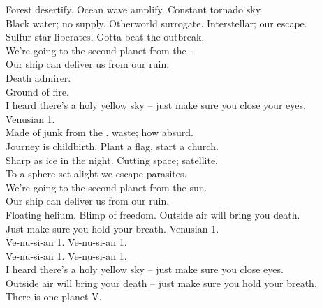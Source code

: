 Forest desertify. Ocean wave amplify. Constant tornado sky. \\
Black water; no supply. Otherworld surrogate. Interstellar; our escape. \\
Sulfur star liberates. Gotta beat the outbreak. \\

We're going to the second planet from the . \\
Our ship can deliver us from our ruin. \\

Death admirer. \\
Ground of fire. \\
I heard there's a holy yellow sky -- just make sure you close your eyes. \\
Venusian 1. \\

Made of junk from the .  waste; how absurd. \\
Journey is childbirth. Plant a flag, start a church. \\
Sharp as ice in the night. Cutting space; satellite. \\
To a sphere set alight we escape parasites. \\

We're going to the second planet from the sun. \\
Our ship can deliver us from our ruin. \\

Floating helium. Blimp of freedom. Outside air will bring you death. \\
Just make sure you hold your breath. Venusian 1. \\

Ve-nu-si-an 1. Ve-nu-si-an 1. \\
Ve-nu-si-an 1. Ve-nu-si-an 1. \\

I heard there's a holy yellow sky -- just make sure you close eyes. \\
Outside air will bring your death -- just make sure you hold your breath. \\

There is one planet V. \\




